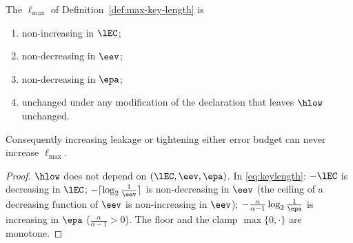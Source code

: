 
\begin{proposition}\label{prop:monotone}
The  $\ell_{\max}$ of
Definition~\ref{def:max-key-length}
is
\begin{enumerate}[label=(\roman*),leftmargin=2.4em]
\item non-increasing in $\lEC$;
\item non-decreasing in $\eev$;
\item non-decreasing in $\epa$;
\item unchanged under any modification of the declaration that leaves
  $\hlow$ unchanged.
\end{enumerate}
Consequently increasing leakage or tightening either error budget can never
increase $\ell_{\max}$.
\end{proposition}

\begin{proof}
$\hlow$ does not depend on $(\lEC,\eev,\epa)$. In
\eqref{eq:keylength}: $-\lEC$ is decreasing in $\lEC$;
$-\lceil\log_2\frac1{\eev}\rceil$ is non-decreasing in $\eev$ (the
ceiling of a decreasing function of $\eev$ is non-increasing in
$\eev$); $-\frac{\alpha}{\alpha-1}\log_2\frac1{\epa}$ is increasing in
$\epa$ ($\frac{\alpha}{\alpha-1}>0$). The floor and the clamp
$\max\{0,\cdot\}$ are monotone.
\end{proof}
